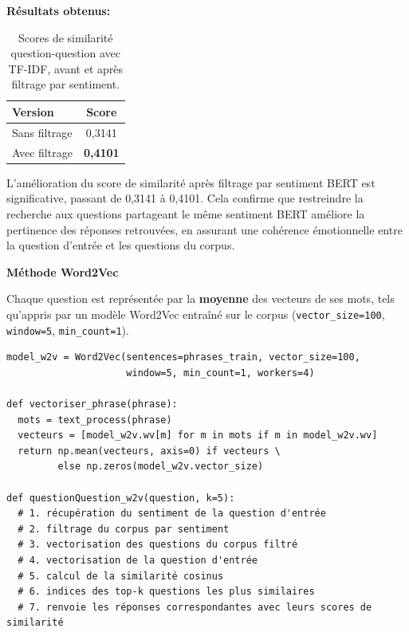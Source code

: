 \documentclass[12pt,a4paper]{report}
\begin{document}
\begin{center}
\textbf{Résultats obtenus:}
\end{center}
\begin{table}[H]
\begin{center}
\begin{tabular}{@{}lc@{}}
  \toprule
  Version & Score \\
  \midrule
  Sans filtrage & 0,3141 \\
  Avec filtrage  & \textbf{0,4101} \\
  \bottomrule
\end{tabular}
\end{center}
\caption{Scores de similarité question-question avec TF-IDF, avant et après filtrage par sentiment.}
\end{table}

\begin{note}
L'amélioration du score de similarité après filtrage par sentiment BERT est significative, passant de 0,3141 à 0,4101.
Cela confirme que restreindre la recherche aux questions partageant le même sentiment BERT améliore la pertinence des réponses retrouvées, en assurant une cohérence émotionnelle entre la question d'entrée et les questions du corpus.
\end{note}

\pagebreak

\textbf{Méthode Word2Vec}

Chaque question est représentée par la \textbf{moyenne} des vecteurs de ses mots, tels qu'appris par un modèle Word2Vec entraîné sur le corpus (\texttt{vector\_size=100}, \texttt{window=5}, \texttt{min\_count=1}).

\begin{lstlisting}
model_w2v = Word2Vec(sentences=phrases_train, vector_size=100,
                     window=5, min_count=1, workers=4)

def vectoriser_phrase(phrase):
  mots = text_process(phrase)
  vecteurs = [model_w2v.wv[m] for m in mots if m in model_w2v.wv]
  return np.mean(vecteurs, axis=0) if vecteurs \
         else np.zeros(model_w2v.vector_size)

def questionQuestion_w2v(question, k=5):
  # 1. récupération du sentiment de la question d'entrée
  # 2. filtrage du corpus par sentiment
  # 3. vectorisation des questions du corpus filtré
  # 4. vectorisation de la question d'entrée
  # 5. calcul de la similarité cosinus
  # 6. indices des top-k questions les plus similaires
  # 7. renvoie les réponses correspondantes avec leurs scores de similarité
 
\end{lstlisting}
\end{document}
